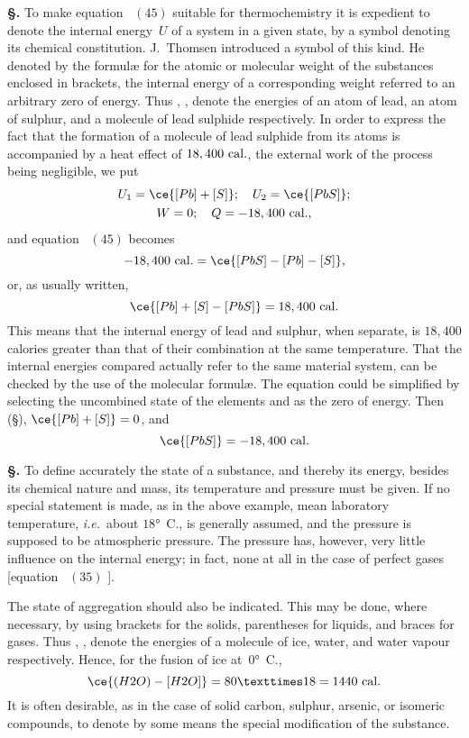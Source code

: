 \documentclass[12pt]{book}[2005/09/16]
\newcommand{\Section}[1]{
  \medskip\par\textbf{§\;#1}
  \label{section:#1}
}
\newcommand{\SecRef}[2][§\;]{\hyperref[section:#2.]{{\upshape #1#2}}}
\newcommand{\Eq}[1]{%
  \hyperref[eqn:#1]{\ensuremath{#1}}%
}
\newcommand{\PageSep}[1]{\ignorespaces}
\newcommand{\ie}{\emph{i.e.}}
\newcommand{\Unit}[1]{\text{\upshape #1}}
\begin{document}
\Section{94.} To make equation~\Eq{(45)} suitable for thermochemistry
%
%
it is expedient to denote the internal energy~$U$ of a system
in a given state, by a symbol denoting its chemical constitution.
J.~Thomsen introduced a symbol of this kind.
He denoted by the formulæ for the atomic or molecular
weight of the substances enclosed in brackets, the internal
energy of a corresponding weight referred to an arbitrary
zero of energy. Thus \ce{[Pb]}, \ce{[S]}, \ce{[PbS]} denote the energies
of an atom of lead, an atom of sulphur, and a molecule of
lead sulphide respectively. In order to express the fact that
%
the formation of a molecule of lead sulphide from its atoms
is accompanied by a heat effect of $18,400~\Unit{cal.}$, the external
work of the process being negligible, we put
\begin{gather*}
U_{1} = \ce{[Pb] + [S]};\quad U_{2} = \ce{[PbS]}; \\
W = 0;\quad Q = -18,400~\Unit{cal.},
\end{gather*}
\PageSep{69}
and equation~\Eq{(45)} becomes
\[
-18,400~\Unit{cal.} = \ce{[PbS] - [Pb] - [S]},
\]
or, as usually written,
\[
\ce{[Pb] + [S] - [PbS]} = 18,400~\Unit{cal.}
\]
This means that the internal energy of lead and sulphur,
when separate, is $18,400$ calories greater than that of their
combination at the same temperature. That the internal
energies compared actually refer to the same material
system, can be checked by the use of the molecular formulæ.
The equation could be simplified by selecting the uncombined
state of the elements  and  as the zero of energy. Then
(\SecRef{64}), $\ce{[Pb] + [S]} = 0$, and
\[
\ce{[PbS]} = -18,400~\Unit{cal.}
\]

\Section{95.} To define accurately the state of a substance, and
%
%
thereby its energy, besides its chemical nature and mass, its
temperature and pressure must be given. If no special
statement is made, as in the above example, mean laboratory
temperature, \ie\ about $18°$~C., is generally assumed, and the
pressure is supposed to be atmospheric pressure. The
pressure has, however, very little influence on the internal
energy; in fact, none at all in the case of perfect gases
[equation~\Eq{(35)}].

The state of aggregation should also be indicated. This
may be done, where necessary, by using brackets for the
solids, parentheses for liquids, and braces for gases. Thus
\ce{[H2O]}, ,  denote the energies of a molecule of
ice, water, and water vapour respectively. Hence, for the
fusion of ice at~$0°$~C.,
\[
\ce{(H2O) - [H2O]} = 80 × 18 = 1440~\Unit{cal.}
\]
It is often desirable, as in the case of solid carbon, sulphur,
arsenic, or isomeric compounds, to denote by some means
the special modification of the substance.
\end{document}
